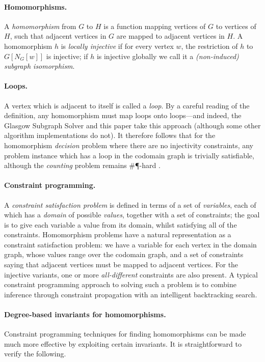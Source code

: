 \documentclass{article}
\begin{document}
\paragraph{Homomorphisms.} A \emph{homomorphism} from $G$ to $H$ is a function mapping vertices of
$G$ to vertices of $H$, such that adjacent vertices in $G$ are mapped to adjacent vertices in $H$. A
homomorphism $h$ is \emph{locally injective} if for every vertex $w$, the restriction of $h$ to
$G[N_G[w]]$ is injective; if $h$ is injective globally we call it a \emph{(non-induced) subgraph
isomorphism}.

\paragraph{Loops.} A vertex which is adjacent to itself is called a \emph{loop}. By a careful reading
of the definition, any homomorphism must map loops onto loops---and indeed, the Glasgow Subgraph
Solver and this paper take this approach (although some other algorithm implementations do not). It
therefore follows that for the homomorphism \emph{decision} problem where there are no injectivity
constraints, any problem instance which has a loop in the codomain graph is trivially satisfiable,
although the \emph{counting} problem remains \#\P-hard \cite{DBLP:journals/rsa/DyerG00}.

\paragraph{Constraint programming.} A \emph{constraint satisfaction problem} is defined in terms of
a set of \emph{variables}, each of which has a \emph{domain} of possible \emph{values}, together
with a set of constraints; the goal is to give each variable a value from its domain, whilst
satisfying all of the constraints. Homomorphism problems have a natural representation as a
constraint satisfaction problem: we have a variable for each vertex in the domain graph, whose
values range over the codomain graph, and a set of constraints saying that adjacent vertices must be
mapped to adjacent vertices. For the injective variants, one or more \emph{all-different}
constraints are also present. A typical constraint programming approach to solving such a problem is
to combine inference through constraint propagation with an intelligent backtracking search.

\paragraph{Degree-based invariants for homomorphisms.} Constraint programming techniques for finding
homomorphisms can be made much more effective by exploiting certain invariants. It is
straightforward to verify the following.
\end{document}
